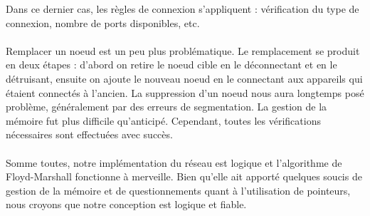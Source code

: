 \documentclass[10pt,letterpaper]{article}
\begin{document}
Dans ce dernier cas, les règles de connexion s’appliquent : vérification du type de connexion, nombre de ports disponibles, etc.\\
\\
Remplacer un noeud est un peu plus problématique. 
Le remplacement se produit en deux étapes : d’abord on retire le noeud cible en le déconnectant et en le détruisant, 
ensuite on ajoute le nouveau noeud en le connectant aux appareils qui étaient connectés à l’ancien. 
La suppression d’un noeud nous aura longtemps posé problème, généralement par des erreurs de segmentation. 
La gestion de la mémoire fut plus difficile qu’anticipé. 
Cependant, toutes les vérifications nécessaires sont effectuées avec succès.\\
\\
Somme toutes, notre implémentation du réseau est logique et l’algorithme de Floyd-Marshall fonctionne à merveille. 
Bien qu’elle ait apporté quelques soucis de gestion de la mémoire et de questionnements quant à l’utilisation de pointeurs, 
nous croyons que notre conception est logique et fiable.



\newpage
\end{document}
